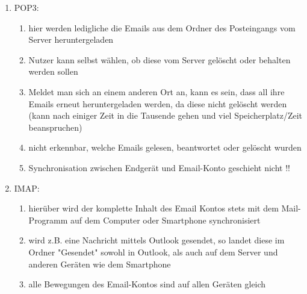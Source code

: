 \documentclass[11pt]{article}
\begin{document}
    \begin{enumerate}
        \item POP3:
        \begin{enumerate}
            \item hier werden ledigliche die Emails aus dem Ordner des Posteingangs
            vom Server heruntergeladen
            \item Nutzer kann selbst wählen, ob diese vom Server gelöscht oder behalten
            werden sollen
            \item Meldet man sich an einem anderen Ort an, kann es sein, dass all ihre Emails
            erneut heruntergeladen werden, da diese nicht gelöscht werden
            (kann nach einiger Zeit in die Tausende gehen und viel Speicherplatz/Zeit beanspruchen)
            \item nicht erkennbar, welche Emails gelesen, beantwortet oder gelöscht wurden
            \item Synchronisation zwischen Endgerät und Email-Konto geschieht nicht !!

        \end{enumerate}

        \item IMAP:
        \begin{enumerate}
            \item hierüber wird der komplette Inhalt des Email Kontos stets mit dem Mail-Programm
            auf dem Computer oder Smartphone synchronisiert
            \item wird z.B. eine Nachricht mittels Outlook gesendet, so landet diese im Ordner "Gesendet"
            sowohl in Outlook, als auch auf dem Server und anderen Geräten wie dem Smartphone
            \item alle Bewegungen des Email-Kontos sind auf allen Geräten gleich

        \end{enumerate}
    \end{enumerate}
\end{document}
